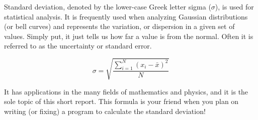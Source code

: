 \documentclass{article}
\begin{document}
Standard deviation, denoted by the lower-case Greek letter sigma ($\sigma$), is used for statistical analysis. It is frequently used when analyzing Gaussian distributions (or bell curves) and represents the variation, or dispersion in a given set of values. Simply put, it just tells us how far a value is from the normal. Often it is referred to as the uncertainty or standard error.


\[\sigma = \sqrt{\frac{\sum_{i=1}^{N} (x_i - \bar{x})^2}{N}}\]


It has applications in the many fields of mathematics and physics, and it is the sole topic of this short report. This formula is your friend when you plan on writing (or fixing) a program to calculate the standard deviation!
\end{document}
